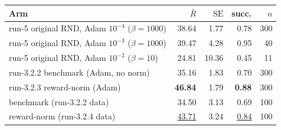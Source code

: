 \begin{tabular}{@{}>{\raggedright\arraybackslash}p{4.6cm} r r r r@{}}
\toprule
\textbf{Arm} & $\bar R$ & $\mathrm{SE}$ & succ. & $n$ \\
\midrule
run-5 original RND, Adam $10^{-4}$ ($\beta{=}1000$) & 38.64 & 1.77 & 0.78 & 300 \\
run-5 original RND, Adam $10^{-3}$ ($\beta{=}1000$) & 39.47 & 4.28 & 0.95 & 40 \\
run-5 original RND, Adam $10^{-2}$ ($\beta{=}10$) & 24.81 & 10.36 & 0.45 & 11 \\
run-3.2.2 benchmark (Adam, no norm) & 35.16 & 1.83 & 0.70 & 300 \\
run-3.2.3 reward-norm (Adam) & \textbf{46.84} & 1.79 & \textbf{0.88} & 300 \\
\midrule
benchmark (run-3.2.2 data) & 34.50 & 3.13 & 0.69 & 100 \\
reward-norm (run-3.2.4 data) & \underline{43.71} & 3.24 & \underline{0.84} & 100 \\
\bottomrule
\end{tabular}
